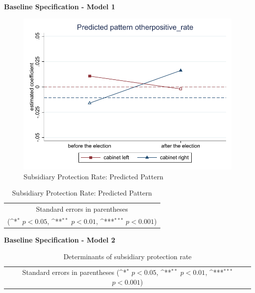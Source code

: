 \documentclass[10pt,a4paper]{scrartcl}
\begin{document}
\clearpage
\textbf{Baseline Specification - Model 1}
\begin{figure}[!ht]
	\centering
	\includegraphics[width=1\textwidth]{figures_edited/otherpositive_rate_graph1_baseline.pdf}
	\caption{Subsidiary Protection Rate: Predicted Pattern}
\end{figure}

\begin{table}[!ht]\centering
	\renewcommand{\arraystretch}{1.25}
	\def\sym#1{\ifmmode^{#1}\else\(^{#1}\)\fi}
	\caption{Subsidiary Protection Rate: Predicted Pattern}
	\begin{tabular}[]{l*{2}{c}}
		\hline\hline
		
		\hline\hline
		\multicolumn{3}{c}{\footnotesize Standard errors in parentheses} \\
		\multicolumn{3}{c}{\footnotesize (\sym{*} \(p<0.05\), \sym{**} \(p<0.01\), \sym{***} \(p<0.001\))}\\
	\end{tabular}
\end{table}

\clearpage
\textbf{Baseline Specification - Model 2}
\begin{table}[!ht]\centering
	\scriptsize
	\renewcommand{\arraystretch}{1.05}
	\def\sym#1{\ifmmode^{#1}\else\(^{#1}\)\fi}
	\caption{Determinants of subsidiary protection rate}
	\begin{tabular}{l*{3}{c}}
		\hline\hline
		
		\hline\hline
		\multicolumn{4}{c}{\footnotesize Standard errors in parentheses (\sym{*} \(p<0.05\), \sym{**} \(p<0.01\), \sym{***} \(p<0.001\))}\\
	\end{tabular}
\end{table}
\end{document}
